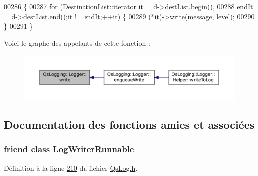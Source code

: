 \begin{DoxyCode}
00286 \{
00287     \textcolor{keywordflow}{for} (DestinationList::iterator it = \hyperlink{classQsLogging_1_1Logger_aab634416e14e5cb4ca3193dc5a9924fa}{d}->\hyperlink{classQsLogging_1_1LoggerImpl_acdbde93fec67bd0bcce8da1fc1080ece}{destList}.begin(),
00288          endIt = \hyperlink{classQsLogging_1_1Logger_aab634416e14e5cb4ca3193dc5a9924fa}{d}->\hyperlink{classQsLogging_1_1LoggerImpl_acdbde93fec67bd0bcce8da1fc1080ece}{destList}.end();it != endIt;++it) \{
00289         (*it)->write(message, level);
00290     \}
00291 \}
\end{DoxyCode}


Voici le graphe des appelants de cette fonction \-:
\nopagebreak
\begin{figure}[H]
\begin{center}
\leavevmode
\includegraphics[width=350pt]{classQsLogging_1_1Logger_ab9789bba5f1644a3b3b51606533aa20f_icgraph}
\end{center}
\end{figure}




\subsection{Documentation des fonctions amies et associées}
\hypertarget{classQsLogging_1_1Logger_a27d33fe348fa48f5be163ad876cdb699}{
\subsubsection[{Log\-Writer\-Runnable}]{\setlength{\rightskip}{0pt plus 5cm}friend class Log\-Writer\-Runnable\hspace{0.3cm}{\ttfamily [friend]}}}\label{classQsLogging_1_1Logger_a27d33fe348fa48f5be163ad876cdb699}


Définition à la ligne \hyperlink{QsLog_8h_source_l00210}{210} du fichier \hyperlink{QsLog_8h_source}{Qs\-Log.\-h}.



